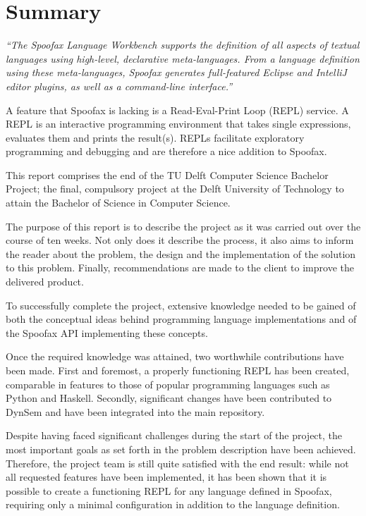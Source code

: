 \chapter{Summary}
\label{cha:summary}

\textit{``The Spoofax Language Workbench supports the definition of all aspects
of textual languages using high-level, declarative meta-languages. From a
language definition using these meta-languages, Spoofax generates full-featured
Eclipse and IntelliJ editor plugins, as well as a command-line interface.''}

A feature that Spoofax is lacking is a Read-Eval-Print Loop (REPL) service. A
REPL is an interactive programming environment that takes single expressions,
evaluates them and prints the result(s). REPLs facilitate exploratory
programming and debugging and are therefore a nice addition to Spoofax.

This report comprises the end of the TU Delft Computer Science Bachelor Project;
the final, compulsory project at the Delft University of Technology to attain
the Bachelor of Science in Computer Science.

The purpose of this report is to describe the project as it was carried out over
the course of ten weeks. Not only does it describe the process, it also aims to
inform the reader about the problem, the design and the implementation of the
solution to this problem. Finally, recommendations are made to the client to
improve the delivered product.

To successfully complete the project, extensive knowledge needed to be gained of
both the conceptual ideas behind programming language implementations and of the
Spoofax API implementing these concepts.

Once the required knowledge was attained, two worthwhile contributions have been
made. First and foremost, a properly functioning REPL has been created,
comparable in features to those of popular programming languages such as Python
and Haskell. Secondly, significant changes have been contributed to DynSem and
have been integrated into the main repository.

Despite having faced significant challenges during the start of the project, the
most important goals as set forth in the problem description have been achieved.
Therefore, the project team is still quite satisfied with the end result: while
not all requested features have been implemented, it has been shown that it is
possible to create a functioning REPL for any language defined in Spoofax,
requiring only a minimal configuration in addition to the language definition.

